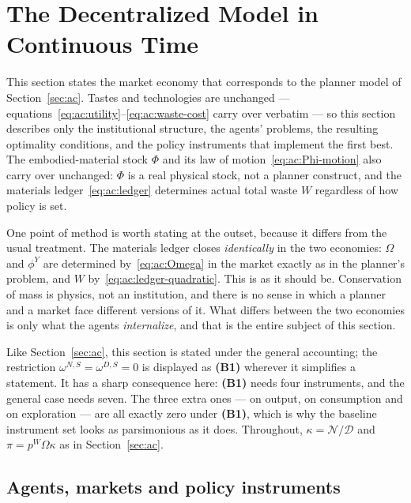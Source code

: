 
\section{The Decentralized Model in Continuous Time}
\label{sec:ad}

This section states the market economy that corresponds to the planner model of Section~\ref{sec:ac}. Tastes and technologies are unchanged --- equations~\eqref{eq:ac:utility}--\eqref{eq:ac:waste-cost} carry over verbatim --- so this section describes only the institutional structure, the agents' problems, the resulting optimality conditions, and the policy instruments that implement the first best. The embodied-material stock $\Phi$ and its law of motion~\eqref{eq:ac:Phi-motion} also carry over unchanged: $\Phi$ is a real physical stock, not a planner construct, and the materials ledger~\eqref{eq:ac:ledger} determines actual total waste $W$ regardless of how policy is set.

One point of method is worth stating at the outset, because it differs from the usual treatment. The materials ledger closes \emph{identically} in the two economies: $\Omega$ and $\phi^Y$ are determined by~\eqref{eq:ac:Omega} in the market exactly as in the planner's problem, and $W$ by~\eqref{eq:ac:ledger-quadratic}. This is as it should be. Conservation of mass is physics, not an institution, and there is no sense in which a planner and a market face different versions of it. What differs between the two economies is only what the agents \emph{internalize}, and that is the entire subject of this section.

Like Section~\ref{sec:ac}, this section is stated under the general accounting; the restriction $\omega^{N,S}=\omega^{D,S}=0$ is displayed as \textbf{(B1)} wherever it simplifies a statement. It has a sharp consequence here: \textbf{(B1)} needs four instruments, and the general case needs seven. The three extra ones --- on output, on consumption and on exploration --- are all exactly zero under \textbf{(B1)}, which is why the baseline instrument set looks as parsimonious as it does. Throughout, $\kappa=\mathcal N/\mathcal D$ and $\pi=p^W\Omega\kappa$ as in Section~\ref{sec:ac}.

\subsection{Agents, markets and policy instruments}
\label{subsec:ad:setup}

